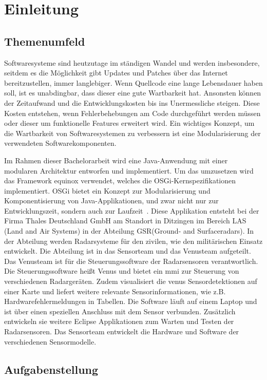 \chapter{Einleitung}

\section{Themenumfeld}
Softwaresysteme sind heutzutage im ständigen Wandel und werden insbesondere, seitdem es die Möglichkeit gibt Updates und Patches über das Internet bereitzustellen, immer langlebiger. Wenn Quellcode eine lange Lebensdauer haben soll, ist es unabdingbar, dass dieser eine gute Wartbarkeit hat. Ansonsten können der Zeitaufwand und die Entwicklungskosten bis ins Unermessliche steigen. Diese Kosten entstehen, wenn Fehlerbehebungen am Code durchgeführt werden müssen oder dieser um funktionelle Features erweitert wird. Ein wichtiges Konzept, um die Wartbarkeit von Softwaresystemen zu verbessern ist eine Modularisierung der verwendeten Softwarekomponenten.

Im Rahmen dieser Bachelorarbeit wird eine Java-Anwendung mit einer modularen Architektur entworfen und implementiert. Um das umzusetzen wird das Framework \Gls{equinox} verwendet, welches die OSGi-Kernspezifikationen implementiert. OSGi bietet ein Konzept zur Modularisierung und Komponentisierung von Java-Applikationen, und zwar nicht nur zur Entwicklungszeit, sondern auch zur Laufzeit~\cite{horn}. Diese Applikation entsteht bei der Firma Thales Deutschland GmbH am Standort in Ditzingen im Bereich LAS (Land and Air Systems) in der Abteilung GSR(Ground- and Surfaceradars). In der Abteilung werden Radarsysteme für den zivilen, wie den militärischen Einsatz entwickelt.  Die Abteilung ist in das Sensorteam und das Venusteam aufgeteilt. Das Venusteam ist für die Steuerungssoftware der Radarsensoren verantwortlich. Die Steuerungssoftware heißt Venus und bietet ein \acrfull{mmi} zur Steuerung von verschiedenen Radargeräten. Zudem visualisiert die \Gls{venus} Sensordetektionen auf einer Karte und liefert weitere relevante Sensorinformationen, wie z.B. Hardwarefehlermeldungen in Tabellen. Die Software läuft auf einem Laptop und ist über einen speziellen Anschluss mit dem Sensor verbunden.  Zusätzlich entwickeln sie weitere Eclipse Applikationen zum Warten und Testen der Radarsensoren. Das Sensorteam entwickelt die Hardware und Software der verschiedenen Sensormodelle.

\section{Aufgabenstellung}

